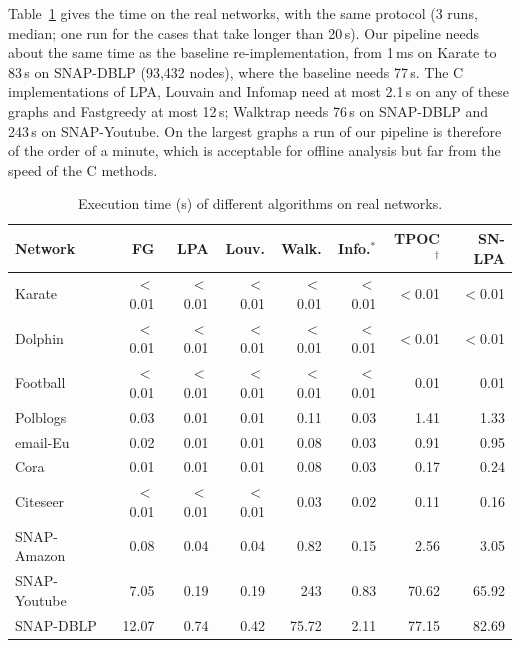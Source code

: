 \documentclass[conference]{IEEEtran}
\begin{document}
Table~\ref{tab:latreal} gives the time on the real networks, with the same protocol (3 runs, median; one run for the cases that take longer than 20\,s). Our pipeline needs about the same time as the baseline re-implementation, from 1\,ms on Karate to 83\,s on SNAP-DBLP (93,432 nodes), where the baseline needs 77\,s. The C implementations of LPA, Louvain and Infomap need at most 2.1\,s on any of these graphs and Fastgreedy at most 12\,s; Walktrap needs 76\,s on SNAP-DBLP and 243\,s on SNAP-Youtube. On the largest graphs a run of our pipeline is therefore of the order of a minute, which is acceptable for offline analysis but far from the speed of the C methods.

\begin{table}[t]
\centering
\caption{Execution time (s) of different algorithms on real networks.}
\label{tab:latreal}
\scriptsize\setlength{\tabcolsep}{2.2pt}
\begin{tabular}{lrrrrrrr}
\toprule
Network & FG & LPA & Louv. & Walk. & Info.$^{*}$ & TPOC$^{\dagger}$ & SN-LPA \\
\midrule
Karate & $<$0.01 & $<$0.01 & $<$0.01 & $<$0.01 & $<$0.01 & $<$0.01 & $<$0.01 \\
Dolphin & $<$0.01 & $<$0.01 & $<$0.01 & $<$0.01 & $<$0.01 & $<$0.01 & $<$0.01 \\
Football & $<$0.01 & $<$0.01 & $<$0.01 & $<$0.01 & $<$0.01 & 0.01 & 0.01 \\
Polblogs & 0.03 & 0.01 & 0.01 & 0.11 & 0.03 & 1.41 & 1.33 \\
email-Eu & 0.02 & 0.01 & 0.01 & 0.08 & 0.03 & 0.91 & 0.95 \\
Cora & 0.01 & 0.01 & 0.01 & 0.08 & 0.03 & 0.17 & 0.24 \\
Citeseer & $<$0.01 & $<$0.01 & $<$0.01 & 0.03 & 0.02 & 0.11 & 0.16 \\
SNAP-Amazon & 0.08 & 0.04 & 0.04 & 0.82 & 0.15 & 2.56 & 3.05 \\
SNAP-Youtube & 7.05 & 0.19 & 0.19 & 243 & 0.83 & 70.62 & 65.92 \\
SNAP-DBLP & 12.07 & 0.74 & 0.42 & 75.72 & 2.11 & 77.15 & 82.69 \\
\bottomrule
\end{tabular}
\end{table}
\end{document}
